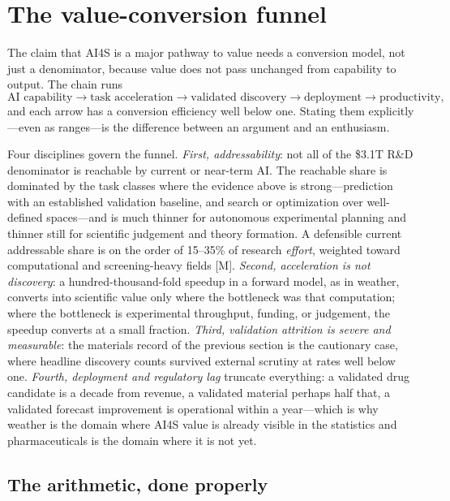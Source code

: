 \section{The value-conversion funnel}
\label{sec:funnel}

The claim that AI4S is a major pathway to value needs a conversion model, not just a denominator, because value does not pass unchanged from capability to output. The chain runs
\[
\text{AI capability} \rightarrow \text{task acceleration} \rightarrow \text{validated discovery} \rightarrow \text{deployment} \rightarrow \text{productivity},
\]
and each arrow has a conversion efficiency well below one. Stating them explicitly---even as ranges---is the difference between an argument and an enthusiasm.



Four disciplines govern the funnel. \emph{First, addressability}: not all of the \$3.1T R\&D denominator is reachable by current or near-term AI. The reachable share is dominated by the task classes where the evidence above is strong---prediction with an established validation baseline, and search or optimization over well-defined spaces---and is much thinner for autonomous experimental planning and thinner still for scientific judgement and theory formation. A defensible current addressable share is on the order of 15--35\% of research \emph{effort}, weighted toward computational and screening-heavy fields [M]. \emph{Second, acceleration is not discovery}: a hundred-thousand-fold speedup in a forward model, as in weather, converts into scientific value only where the bottleneck was that computation; where the bottleneck is experimental throughput, funding, or judgement, the speedup converts at a small fraction. \emph{Third, validation attrition is severe and measurable}: the materials record of the previous section is the cautionary case, where headline discovery counts survived external scrutiny at rates well below one. \emph{Fourth, deployment and regulatory lag} truncate everything: a validated drug candidate is a decade from revenue, a validated material perhaps half that, a validated forecast improvement is operational within a year---which is why weather is the domain where AI4S value is already visible in the statistics and pharmaceuticals is the domain where it is not yet.

\subsection{The arithmetic, done properly}
\label{sec:funnelmath}

